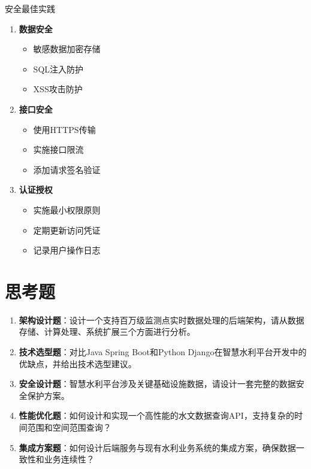  安全最佳实践

\begin{enumerate}
\def\labelenumi{\arabic{enumi}.}
\tightlist
\item
  \textbf{数据安全}

  \begin{itemize}
  \tightlist
  \item
    敏感数据加密存储
  \item
    SQL注入防护
  \item
    XSS攻击防护
  \end{itemize}
\item
  \textbf{接口安全}

  \begin{itemize}
  \tightlist
  \item
    使用HTTPS传输
  \item
    实施接口限流
  \item
    添加请求签名验证
  \end{itemize}
\item
  \textbf{认证授权}

  \begin{itemize}
  \tightlist
  \item
    实施最小权限原则
  \item
    定期更新访问凭证
  \item
    记录用户操作日志
  \end{itemize}
\end{enumerate}

\section{思考题}

\begin{enumerate}
\def\labelenumi{\arabic{enumi}.}
\item
  \textbf{架构设计题}：设计一个支持百万级监测点实时数据处理的后端架构，请从数据存储、计算处理、系统扩展三个方面进行分析。
\item
  \textbf{技术选型题}：对比Java Spring Boot和Python Django在智慧水利平台开发中的优缺点，并给出技术选型建议。
\item
  \textbf{安全设计题}：智慧水利平台涉及关键基础设施数据，请设计一套完整的数据安全保护方案。
\item
  \textbf{性能优化题}：如何设计和实现一个高性能的水文数据查询API，支持复杂的时间范围和空间范围查询？
\item
  \textbf{集成方案题}：如何设计后端服务与现有水利业务系统的集成方案，确保数据一致性和业务连续性？
\end{enumerate}

